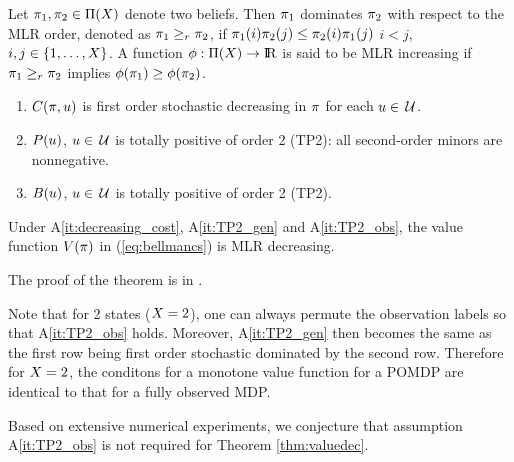 \documentclass[draftcls,onecolumn]{IEEEtran}
\begin{document}
 \begin{definition}   \label{def:mlr}
Let $\pi_1, \pi_2 \in \Pi(X)$ denote  two beliefs.
Then $\pi_1$ dominates $\pi_2$ with respect to the MLR order, denoted as
$\pi_1 \geq_r \pi_2$,
 if %
$ \pi_1(i) \pi_2(j) \leq \pi_2(i) \pi_1(j)$ $i < j$,  $i,j\in \{1,\ldots,X\}$.  A function $\fun:\Belief\rightarrow \reals$ is said to be MLR increasing if $\pi_1 \geq_r \pi_2$ implies $\phi(\pi_1) \geq \phi(\pi_2)$. 

\end{definition}
\begin{enumerate}[\bf{(A}1)]

\item\label{it:decreasing_cost}  $C(\pi,u)$ is  first order stochastic  decreasing in $\pi$ for each $ u \in \,\mathcal{U}$.
\item\label{it:TP2_gen} $P(u)$,  $u \in \,\mathcal{U}$ is  totally positive of order 2 (TP2):  all second-order minors are nonnegative.
\item\label{it:TP2_obs} $B(u)$,  $u \in \,\mathcal{U}$ is  totally positive of order 2 (TP2).
\end{enumerate}

\begin{theorem} \label{thm:valuedec}
Under A\ref{it:decreasing_cost},  A\ref{it:TP2_gen} and A\ref{it:TP2_obs}, the value function $V(\pi)$ in (\ref{eq:bellmancs}) is MLR decreasing.
\end{theorem}
The proof of the theorem is in \cite{Kri16,KD07}.

Note that for 2 states  ($X = 2$),  one can  always  permute the observation labels so that A\ref{it:TP2_obs} holds. 
Moreover, A\ref{it:TP2_gen} then becomes the same as the first row being first order stochastic dominated by the second row.
Therefore for $X=2$, the conditons for a monotone value function for a POMDP are identical to that for a fully observed MDP.

Based on extensive numerical experiments, we conjecture that assumption A\ref{it:TP2_obs} is not required for  Theorem \ref{thm:valuedec}.
\end{document}
